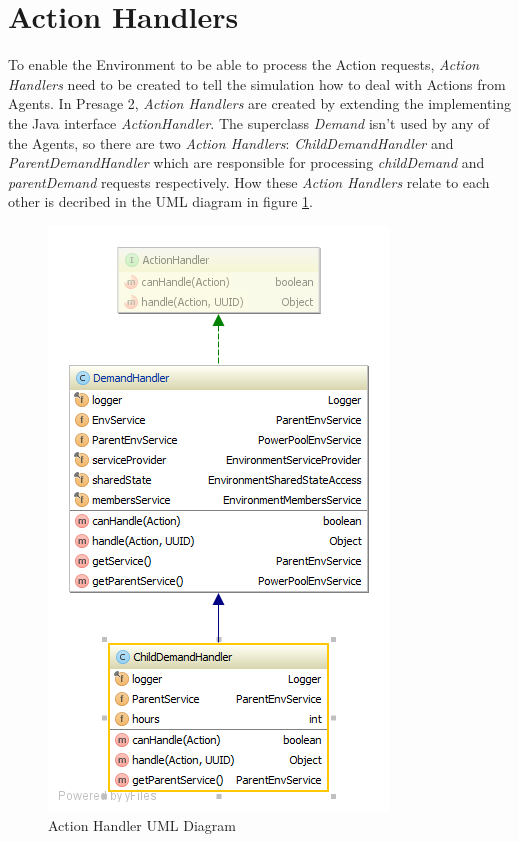 \section*{Action Handlers} %
To enable the Environment to be able to process the Action requests, \textit{Action Handlers} need to be created to tell the simulation how to deal with Actions from Agents. In Presage 2, \textit{Action Handlers} are created by extending the implementing the Java interface \textit{ActionHandler}. The superclass \textit{Demand} isn't used by any of the Agents, so there are two \textit{Action Handlers}:  \textit{ChildDemandHandler} and \textit{ParentDemandHandler} which are responsible for processing \textit{childDemand} and \textit{parentDemand} requests respectively. How these \textit{Action Handlers} relate to each other is decribed in the UML diagram in figure \ref{fig:ActionHandlerUML}. 

\begin{figure}[!h]
	\centering
	\includegraphics[scale=0.4]{Images/ActionHandlerUML.png}
	\caption{Action Handler UML Diagram}
	\label{fig:ActionHandlerUML}
\end{figure}

